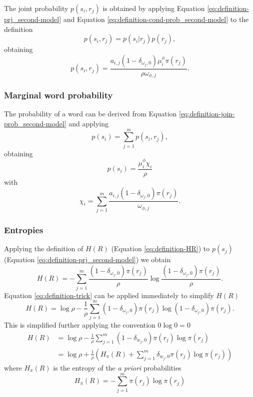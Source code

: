 The joint probability $p(s_i, r_j)$ is obtained by applying Equation \eqref{eq:definition-prj_second-model} and Equation \eqref{eq:definition-cond-prob_second-model} to the definition
\begin{equation*}
  p(s_i, r_j) = p(s_i | r_j) p(r_j),
\end{equation*}
obtaining
\begin{equation}
  \label{eq:definition-join-prob_second-model}
  p(s_i, r_j) = \frac{a_{i,j} (1 - \delta_{\omega_j,0}) \mu_i^\phi \pi(r_j)}{\rho \omega_{\phi,j}}.
\end{equation}

\subsubsection{Marginal word probability}

The probability of a word can be derived from Equation \eqref{eq:definition-join-prob_second-model} and applying
\begin{equation*}
  p(s_i) = \sum_{j=1}^m p(s_i, r_j),
\end{equation*}
obtaining
\begin{equation}
  \label{eq:definition-psi_second-model}
  p(s_i) = \frac{\mu_i^\phi \chi_i}{\rho}
\end{equation}
with
\begin{equation}
  \label{eq:definition-chi_second-model}
  \chi_i = \sum_{j=1}^m \frac{a_{i,j} (1 - \delta_{\omega_j,0}) \pi(r_j)}{\omega_{\phi,j}}.
\end{equation}

\subsubsection{Entropies}

Applying the definition of $H(R)$ (Equation \eqref{eq:definition-HR}) to $p(s_j)$ (Equation \eqref{eq:definition-prj_second-model}) we obtain
\begin{equation*}
  H(R) = - \sum_{j=1}^m \frac{(1 - \delta_{\omega_j,0}) \pi(r_j)}{\rho} \log \frac{(1 - \delta_{\omega_j,0}) \pi(r_j)}{\rho}.
\end{equation*}
Equation \eqref{eq:definition-trick} can be applied immediately to simplify $H(R)$
\begin{equation*}
  H(R) = \log \rho - \frac{1}{\rho} \sum_{j=1}^m (1 - \delta_{\omega_j,0}) \pi(r_j) \log (1-\delta_{\omega_j,0}) \pi(r_j).
\end{equation*}
This is simplified further applying the convention $0 \log 0 = 0$
\begin{align}
  \label{eq:definition-HR_second-model}
  H(R) &= \log \rho - \frac{1}{\rho} \sum_{j=1}^m (1 - \delta_{w_j,0}) \pi(r_j) \log \pi(r_j) \\  
       &= \log \rho + \frac{1}{\rho} \left( H_\pi(R) + \sum_{j=1}^m \delta_{w_j,0} \pi(r_j) \log \pi(r_j) \right) \nonumber
\end{align}
where $H_\pi(R)$ is the entropy of the \emph{a priori} probabilities
\begin{equation*}
  H_\pi(R) = -\sum_{j=1}^m \pi(r_j) \log \pi(r_j)
\end{equation*}

